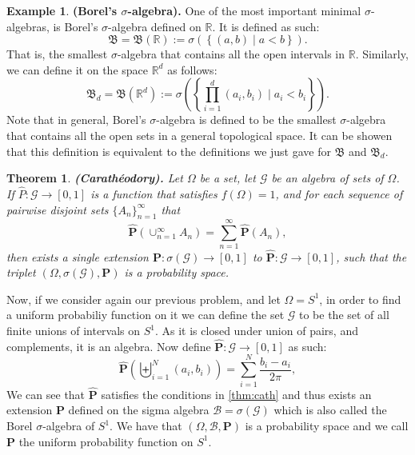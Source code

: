 \documentclass[11pt,a4paper]{article}
\theoremstyle{definition}
\newtheorem{example}{Example}[section]
\theoremstyle{plain}
\newtheorem{theorem}{Theorem}[section]
\newcommand{\R}{\mathbb{R}}
\newcommand{\set}[2]{ \left\{ #1 \mid #2 \right\} }
\renewcommand{\tt}[1]{\textnormal{\textbf{(#1).}}} %
\begin{document}
  \begin{example}
    \tt{Borel's $\sigma$-algebra}
    One of the most important minimal $\sigma$-algebras, is Borel's 
    $\sigma$-algebra defined on $\R$. It is defined as such:
    \[
      \mathfrak B = \mathfrak B(\R) := \sigma(\set{(a,b)}{a < b}).
    \]
    That is, the smallest $\sigma$-algebra that contains all the open 
    intervals in $\R$. Similarly, we can define it on the space $\R^d$
    as follows:
    \[
      \mathfrak B_d = \mathfrak B(\R^d) := 
      \sigma\left(\set{\prod_{i=1}^{d}(a_i,b_i)}{a_i < b_i}\right).
    \]
    Note that in general, Borel's $\sigma$-algebra is defined to be
    the smallest $\sigma$-algebra that contains all the open sets in a
    general topological space. It can be showen that this definition is
    equivalent to the definitions we just gave for $\mathfrak B$ and
    $\mathfrak B_d$.
  \end{example}

  \begin{theorem}\label{thm:cath}
    \tt{Carath\'eodory}
    Let $\Omega$ be a set, let $\mathcal G$ be an algebra of sets of $\Omega$.
    If $\widehat{P} \colon \mathcal G \to [0,1]$ is a function that satisfies
    $f(\Omega) = 1$, and for each sequence of pairwise disjoint sets
    $\{A_n\}_{n=1}^{\infty}$ that
      \[
        \widehat{\mathbf P} \left(\cup_{n=1}^{\infty}{A_n}\right) = 
        \sum_{n=1}^{\infty}{\widehat{\mathbf P}(A_n)},
      \]
    then exists a single extension 
    $\mathbf P \colon \sigma(\mathcal G) \to [0,1]$ to 
    $\widehat{\mathbf P} \colon \mathcal G \to [0,1]$, such that the triplet
    $(\Omega, \sigma(\mathcal G), \mathbf P)$ is a probability space.
  \end{theorem}

  Now, if we consider again our previous problem, and let $\Omega = S^1$,
  in order to find a uniform probabiliy function on it we can define the
  set $\mathcal G$ to be the set of all finite unions of intervals on $S^1$.
  As it is closed under union of pairs, and complements, it is an algebra.
  Now define $\widehat{\mathbf P} \colon \mathcal G \to [0,1]$ as such:
  \[
    \widehat{\mathbf{P}}\left(\biguplus_{i=1}^{N}\left(a_{i},b_{i}\right)\right)
    = \sum_{i=1}^{N}\frac{b_{i}-a_{i}}{2\pi},
  \]
  We can see that $\widehat{\mathbf P}$ satisfies the conditions in 
  \autoref{thm:cath} and thus exists an extension $\mathbf P$ defined on
  the sigma algebra $\mathcal B = \sigma(\mathcal G)$ which is also called
  the Borel $\sigma$-algebra of $S^1$. We have that 
  $(\Omega, \mathcal B, \mathbf P)$ is a probability space and we call 
  $\mathbf P$ the uniform probability function on $S^1$.
\end{document}
